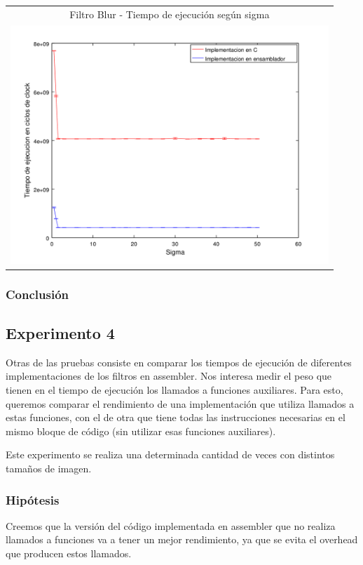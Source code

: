		{\centering \begin{tabular}{c}
      		{\small Filtro Blur - Tiempo de ejecución según sigma} \\
      		\includegraphics[width=12cm]{../exp/graficos/exp3-tiempo_segun_sigma.png} \\
    	\end{tabular}}

		\subsubsection{Conclusión}


	\subsection{Experimento 4}
		Otras de las pruebas consiste en comparar los tiempos de ejecución de diferentes implementaciones de los filtros en assembler. Nos interesa medir el peso que tienen en el tiempo de ejecución los llamados a funciones auxiliares. Para esto, queremos comparar el rendimiento de una implementación que utiliza llamados a estas funciones, con el de otra que tiene todas las instrucciones necesarias en el mismo bloque de código (sin utilizar esas funciones auxiliares). 
		
		Este experimento se realiza una determinada cantidad de veces con distintos tamaños de imagen.

		\subsubsection{Hipótesis} 
			Creemos que la versión del código implementada en assembler que no realiza llamados a funciones va a tener un mejor rendimiento, ya que se evita el overhead que producen estos llamados.
		
